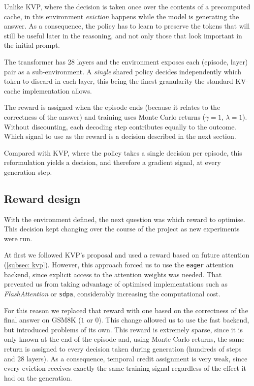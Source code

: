 Unlike KVP, where the decision is taken once over the contents of a precomputed cache, in this environment \textit{eviction} happens while the model is generating the answer. As a consequence, the policy has to learn to preserve the tokens that will still be useful later in the reasoning, and not only those that look important in the initial prompt.

The transformer has 28 layers and the environment exposes each (episode, layer) pair as a sub-environment. A \emph{single} shared policy decides independently which token to discard in each layer, this being the finest granularity the standard KV-cache implementation allows.

The reward is assigned when the episode ends (because it relates to the correctness of the answer) and training uses Monte Carlo returns ($\gamma=1$, $\lambda=1$). Without discounting, each decoding step contributes equally to the outcome. Which signal to use as the reward is a decision described in the next section.

Compared with KVP, where the policy takes a single decision per episode, this reformulation yields a decision, and therefore a gradient signal, at every generation step.


\subsection{Reward design} \label{subsec: recompensa}

With the environment defined, the next question was which reward to optimise. This decision kept changing over the course of the project as new experiments were run.

At first we followed KVP's proposal and used a reward based on future attention (\cref{subsec: kvp}). However, this approach forced us to use the \texttt{eager} attention backend, since explicit access to the attention weights was needed. That prevented us from taking advantage of optimised implementations such as \textit{FlashAttention} or \texttt{sdpa}, considerably increasing the computational cost.

For this reason we replaced that reward with one based on the correctness of the final answer on GSM8K ($1$ or $0$). This change allowed us to use the fast backend, but introduced problems of its own. This reward is extremely sparse, since it is only known at the end of the episode and, using Monte Carlo returns, the same return is assigned to every decision taken during generation (hundreds of steps and 28 layers). As a consequence, temporal credit assignment is very weak, since every eviction receives exactly the same training signal regardless of the effect it had on the generation.

